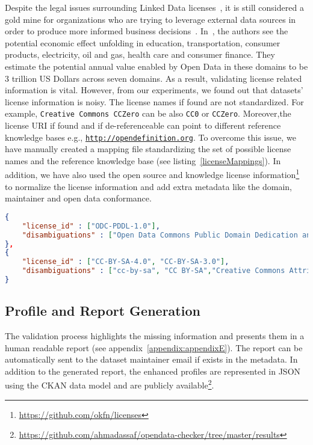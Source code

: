 Despite the legal issues surrounding Linked Data licenses~\cite{Prateek:Misc:13}, it is still considered a gold mine for organizations who are trying to leverage external data sources in order to produce more informed business decisions~\cite{Boyd:Article:11}. In~\cite{Manyika:Report:13}, the authors see the potential economic effect unfolding in education, transportation, consumer products, electricity, oil and gas, health care and consumer finance. They estimate the potential annual value enabled by Open Data in these domains to be 3 trillion US Dollars across seven domains. As a result, validating license related information is vital. However, from our experiments, we found out that datasets' license information is noisy. The license names if found are not standardized. For example, \texttt{Creative Commons CCZero} can be also \texttt{CC0} or \texttt{CCZero}. Moreover,the license URI if found and if de-referenceable can point to different reference knowledge bases e.g., \texttt{\url{http://opendefinition.org}}. To overcome this issue, we have manually created a mapping file standardizing the set of possible license names and the reference knowledge base (see listing~\ref{licenseMappings}). In addition, we have also used the open source and knowledge license information\footnote{\url{https://github.com/okfn/licenses}} to normalize the license information and add extra metadata like the domain, maintainer and open data conformance.

\begin{lstlisting}[language=json]
{
	"license_id" : ["ODC-PDDL-1.0"],
	"disambiguations" : ["Open Data Commons Public Domain Dedication and License (PDDL)"]
},
{
	"license_id" : ["CC-BY-SA-4.0", "CC-BY-SA-3.0"],
	"disambiguations" : ["cc-by-sa", "CC BY-SA","Creative Commons Attribution Share-Alike"]
}
\end{lstlisting}

\subsection{Profile and Report Generation}
The validation process highlights the missing information and presents them in a human readable report (see appendix~\ref{appendix:appendixE}). The report can be automatically sent to the dataset maintainer email if exists in the metadata. In addition to the generated report, the enhanced profiles are represented in JSON using the CKAN data model and are publicly available\footnote{\url{https://github.com/ahmadassaf/opendata-checker/tree/master/results}}.\\

